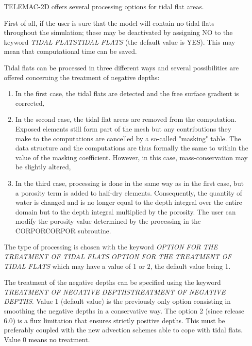  TELEMAC-2D offers several processing options for tidal flat areas.

 First of all, if the user is sure that the model will contain no tidal flats throughout the simulation; these may be deactivated by assigning NO to the keyword \textit{TIDAL FLATSTIDAL FLATS} (the default value is YES). This may mean that computational time can be saved.

 Tidal flats can be processed in three different ways and several possibilities are offered concerning the treatment of negative depths:

\begin{enumerate}
\item  In the first case, the tidal flats are detected and the free surface gradient is corrected,

\item  In the second case, the tidal flat areas are removed from the computation. Exposed elements still form part of the mesh but any contributions they make to the computations are cancelled by a so-called "masking" table. The data structure and the computations are thus formally the same to within the value of the masking coefficient. However, in this case, mass-conservation may be slightly altered,

\item  In the third case, processing is done in the same way as in the first case, but a porosity term is added to half-dry elements. Consequently, the quantity of water is changed and is no longer equal to the depth integral over the entire domain but to the depth integral multiplied by the porosity. The user can modify the porosity value determined by the processing in the CORPORCORPOR subroutine.
\end{enumerate}

 The type of processing is chosen with the keyword \textit{OPTION FOR THE TREATMENT OF TIDAL FLATS} \textit{OPTION FOR THE TREATMENT OF TIDAL FLATS}  which may have a value of 1 or 2, the default value being 1.

 The treatment of the negative depths can be specified using the keyword \textit{TREATMENT OF NEGATIVE DEPTHSTREATMENT OF NEGATIVE DEPTHS}. Value 1 (default value) is the previously only option consisting in smoothing the negative depths in a conservative way. The option 2 (since release 6.0) is a flux limitation that ensures strictly positive depths. This must be preferably coupled with the new advection schemes able to cope with tidal flats. Value 0 means no treatment.

